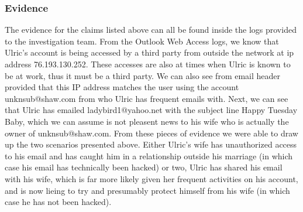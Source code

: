 \documentclass[paper=a4, fontsize=11pt]{scrartcl} %
\numberwithin{equation}{section} %
\numberwithin{figure}{section} %
\numberwithin{table}{section} %
\begin{document}

\subsubsection{Evidence}
The evidence for the claims listed above can all be found inside the logs provided to the
investigation team. From the Outlook Web Access logs, we know that Ulric's account is being
accessed by a third party from outside the network at ip address 76.193.130.252. These accesses
are also at times when Ulric is known to be at work, thus it must be a third party. We can 
also see from email header provided that this IP address matches the user using the account
unknsub@shaw.com from who Ulric has frequent emails with. Next, we can see that Ulric has
emailed ladybird1@yahoo.net with the subject line Happy Tuesday Baby, which we can assume
is not pleasent news to his wife who is actually the owner of unknsub@shaw.com. From these
pieces of evidence we were able to draw up the two scenarios presented above. Either Ulric's
wife has unauthorized access to his email and has caught him in a relationship outside his
marriage (in which case his email has technically been hacked) or two, Ulric has shared
his email with his wife, which is far more likely given her frequent activities on his account,
and is now lieing to try and presumably protect himself from his wife (in which case he has
not been hacked). 
\end{document}
